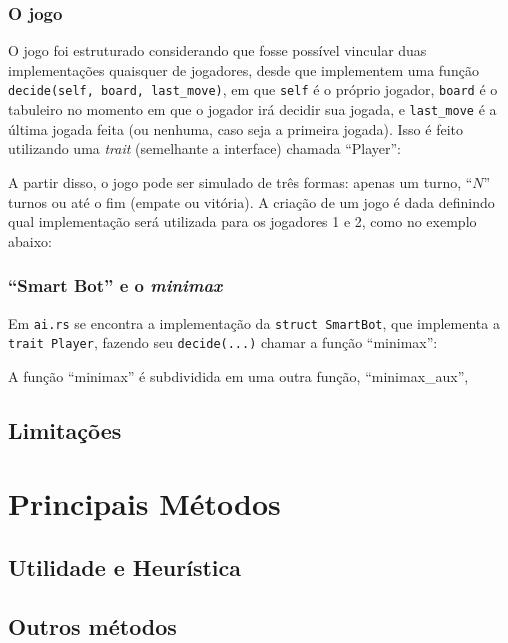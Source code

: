 \documentclass{article}
\newcommand{\todo}[1]{{\color{red}{#1}}}
\newcommand{\rustinline}[1]{\texttt{#1}}
\begin{document}
    \subsubsection{O jogo}

    O jogo foi estruturado considerando que fosse possível vincular duas
    implementações quaisquer de jogadores, desde que implementem uma função
    \rustinline{decide(self, board, last_move)}, em que \texttt{self} é
    o próprio jogador, \texttt{board} é o tabuleiro no momento em que o jogador
    irá decidir sua jogada, e \texttt{last\_move} é a última jogada feita (ou
    nenhuma, caso seja a primeira jogada). Isso é feito utilizando uma
    \textit{trait} (semelhante a interface) chamada ``Player'':


    A partir disso, o jogo pode ser simulado de três formas: apenas um turno,
    ``$N$'' turnos ou até o fim (empate ou vitória). A criação de um jogo é
    dada definindo qual implementação será utilizada para os jogadores 1 e 2,
    como no exemplo abaixo:


    \subsubsection{``Smart Bot'' e o \textit{minimax}}

    Em \texttt{ai.rs} se encontra a implementação da \rustinline{struct
    SmartBot}, que implementa a \rustinline{trait Player}, fazendo seu
    \rustinline{decide(...)} chamar a função ``minimax'':


    A função ``minimax'' é subdividida em uma outra função, ``minimax\_aux'',
    \todo{Mas essa parte o Cauê sabe melhor} \todo{AVANÇA NESSA CAVALA IMUNDA.}

    \subsection{Limitações}

    \todo{AVANÇA NESSA CAVALA IMUNDA.}

    \section{Principais Métodos}

    \todo{Provavelmente vai ficar embutido nos outros tópicos.}

    \subsection{Utilidade e Heurística}

    \todo{Tiz, descreve aqui bonitinho as heurísticas. AVANÇA NESSA CAVALA
    IMUNDA.}

    \subsection{Outros métodos}
\end{document}
